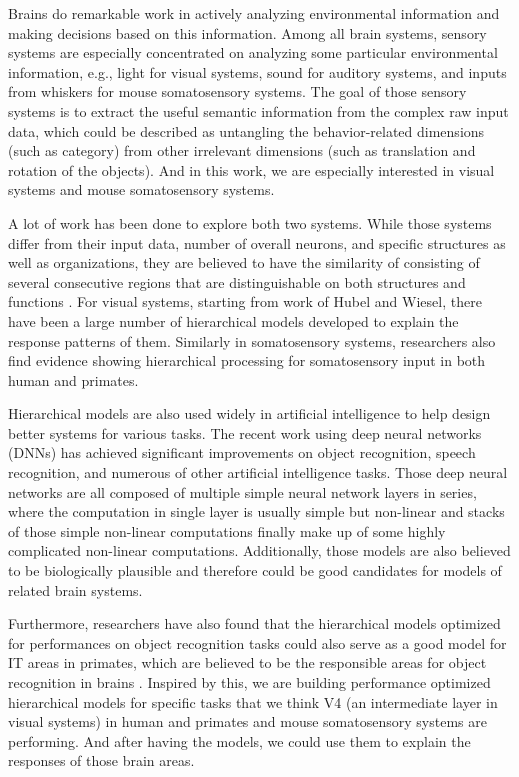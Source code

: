 \documentclass[12pt]{article}
\begin{document}
Brains do remarkable work in actively analyzing environmental information and making decisions based on this information. Among all brain systems, sensory systems are especially concentrated on analyzing some particular environmental information, e.g., light for visual systems, sound for auditory systems, and inputs from whiskers for mouse somatosensory systems.
The goal of those sensory systems is to extract the useful semantic information from the complex raw input data, which could be described as untangling the behavior-related dimensions (such as category) from other irrelevant dimensions (such as translation and rotation of the objects)\cite{yamins2016using}. And in this work, we are especially interested in visual systems and mouse somatosensory systems.

A lot of work has been done to explore both two systems. While those systems differ from their input data, number of overall neurons, and specific structures as well as organizations, they are believed to have the similarity of consisting of several consecutive regions that are distinguishable on both structures and functions \cite{felleman1991distributed}.
For visual systems, starting from work of Hubel and Wiesel\cite{Hubel1959}, there have been a large number of hierarchical models developed to explain the response patterns of them\cite{riesenhuber1999hierarchical, serre2007feedforward, fukushima1980neocognitron, bengio2009learning, pinto2009high}.
Similarly in somatosensory systems, researchers also find evidence showing hierarchical processing for somatosensory input in both human and primates\cite{Pons1987, Inui2004, Iwamura1998}.

Hierarchical models are also used widely in artificial intelligence to help design better systems for various tasks. The recent work using deep neural networks (DNNs) has achieved significant improvements on object recognition, speech recognition, and numerous of other artificial intelligence tasks\cite{Krizhevsky, hinton2012deep, lecun2015deep}. Those deep neural networks are all composed of multiple simple neural network layers in series, where the computation in single layer is usually simple but non-linear and stacks of those simple non-linear computations finally make up of some highly complicated non-linear computations. Additionally, those models are also believed to be biologically plausible and therefore could be good candidates for models of related brain systems.

Furthermore, researchers have also found that the hierarchical models optimized for performances on object recognition tasks could also serve as a good model for IT areas in primates, which are believed to be the responsible areas for object recognition in brains \cite{Yamins2013, Yamins2014, Cadieu2014}. Inspired by this, we are building performance optimized hierarchical models for specific tasks that we think V4 (an intermediate layer in visual systems) in human and primates and mouse somatosensory systems are performing. And after having the models, we could use them to explain the responses of those brain areas.
\end{document}
